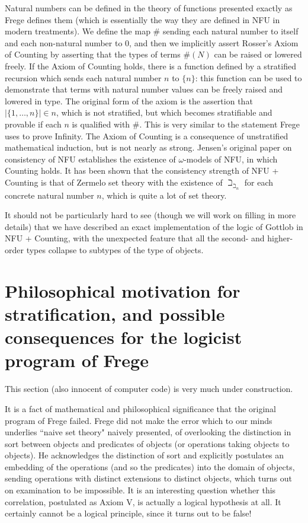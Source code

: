 \documentclass{article}
\begin{document}
{{Natural numbers can be defined in the theory of functions presented exactly as Frege defines them (which is essentially the way they are defined in NFU in modern treatments).  We define the map $\#$ sending each natural number to itself and each non-natural number to 0, and then we implicitly assert Rosser's Axiom of Counting by asserting that the types of terms
$\#(N)$ can be raised or lowered freely.   If the Axiom of Counting holds, there is a function defined by a stratified recursion which sends each natural number $n$ to $\{n\}$:  this function can be used to demonstrate that terms with natural number values can be freely raised and lowered in type.   The original form of the axiom is the assertion that $|\{1,\ldots,n\}| \in n$, which is not stratified, but which becomes stratifiable and provable if
each $n$ is qualified with $\#$.  This is very similar to the statement Frege uses to prove Infinity.  The Axiom of Counting is a consequence of unstratified mathematical induction, but is not nearly as strong.  Jensen's original  paper on consistency
of NFU establishes the existence of $\omega$-models of NFU, in which Counting holds.  It has been shown that the consistency strength of NFU + Counting is that of
Zermelo set theory with the existence of $\beth_{\beth_n}$ for each concrete natural number $n$, which is quite a lot of set theory.

It should not be particularly hard to see (though we will work on filling in more details) that we have described an exact implementation of the logic of Gottlob in NFU + Counting, with the unexpected feature that all the second- and higher-order types collapse to subtypes of the type of objects.



\newpage

\section{Philosophical motivation for stratification, and possible consequences for the logicist program of Frege}

This section (also innocent of computer code) is very much under construction.

It is a fact of mathematical and philosophical significance that the original program of Frege failed.  Frege did not make the error which to our minds underlies ``naive set theory" naively presented, of overlooking the distinction in sort between objects and predicates of objects (or operations taking objects to objects).  He acknowledges the distinction of sort and explicitly postulates an  embedding of the operations (and so the predicates) into the domain of objects, sending operations with distinct extensions to distinct objects, which turns out on examination to be impossible. It is an interesting question whether this correlation, postulated as Axiom V, is actually a logical hypothesis at all.  It certainly cannot be a logical principle, since it turns out to be false!

}}
\end{document}
